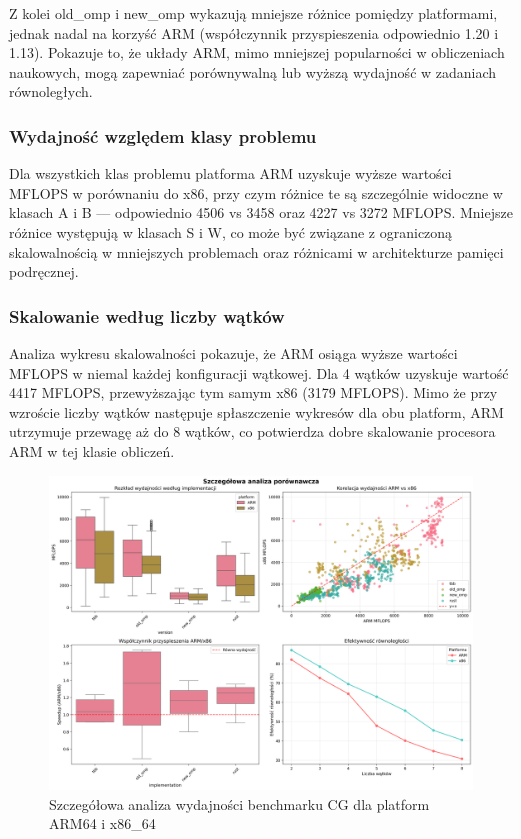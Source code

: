 Z kolei old\_omp i new\_omp wykazują mniejsze różnice pomiędzy platformami, jednak nadal na korzyść ARM (współczynnik przyspieszenia odpowiednio 1.20 i 1.13). Pokazuje to, że układy ARM, mimo mniejszej popularności w obliczeniach naukowych, mogą zapewniać porównywalną lub wyższą wydajność w zadaniach równoległych.
\subsubsection{Wydajność względem klasy problemu}
Dla wszystkich klas problemu platforma ARM uzyskuje wyższe wartości MFLOPS w porównaniu do x86, przy czym różnice te są szczególnie widoczne w klasach A i B — odpowiednio 4506 vs 3458 oraz 4227 vs 3272 MFLOPS. Mniejsze różnice występują w klasach S i W, co może być związane z ograniczoną skalowalnością w mniejszych problemach oraz różnicami w architekturze pamięci podręcznej.
\subsubsection{Skalowanie według liczby wątków}
Analiza wykresu skalowalności pokazuje, że ARM osiąga wyższe wartości MFLOPS w niemal każdej konfiguracji wątkowej. Dla 4 wątków uzyskuje wartość 4417 MFLOPS, przewyższając tym samym x86 (3179 MFLOPS). Mimo że przy wzroście liczby wątków następuje spłaszczenie wykresów dla obu platform, ARM utrzymuje przewagę aż do 8 wątków, co potwierdza dobre skalowanie procesora ARM w tej klasie obliczeń.

\begin{figure}[H]
    \centering
    \includegraphics[width=\textwidth]{analiza/images/parallel/cg/compare/cg_szczegolowa_analiza_wydajnosci.png}
    \caption{Szczegółowa analiza wydajności benchmarku CG dla platform ARM64 i x86\_64}
    \label{cg_szczegolowa_analiza_wydajnosci}
\end{figure}
